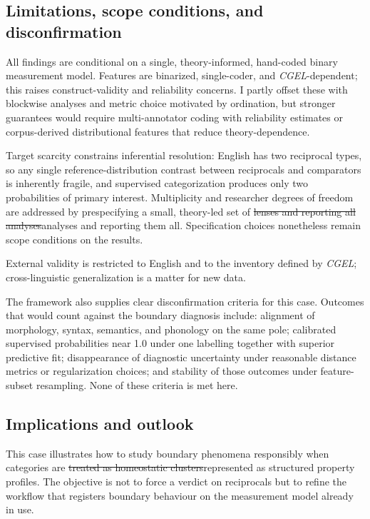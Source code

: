 \documentclass[12pt]{article}
\providecommand{\DIFaddtex}[1]{{\protect\color{DIFgreen}#1}} %
\providecommand{\DIFdeltex}[1]{{\protect\color{red}\sout{#1}}}                      %
\providecommand{\DIFaddbegin}{} %
\providecommand{\DIFaddend}{} %
\providecommand{\DIFdelbegin}{} %
\providecommand{\DIFdelend}{} %
\providecommand{\DIFadd}[1]{\texorpdfstring{\DIFaddtex{#1}}{#1}} %
\providecommand{\DIFdel}[1]{\texorpdfstring{\DIFdeltex{#1}}{}} %
\newcommand{\DIFscaledelfig}{0.5}
\newlength{\DIFdelgraphicswidth} %
\newlength{\DIFdelgraphicsheight} %
\newcommand{\DIFaddincludegraphics}[2][]{{\color{DIFgreen}\fbox{\DIFOincludegraphics[#1]{#2}}}} %
\newcommand{\DIFdelincludegraphics}[2][]{%
\sbox{\DIFdelgraphicsbox}{\DIFOincludegraphics[#1]{#2}}%
\settoboxwidth{\DIFdelgraphicswidth}{\DIFdelgraphicsbox} %
\settoboxtotalheight{\DIFdelgraphicsheight}{\DIFdelgraphicsbox} %
\scalebox{\DIFscaledelfig}{%
\parbox[b]{\DIFdelgraphicswidth}{\usebox{\DIFdelgraphicsbox}\\[-\baselineskip] \rule{\DIFdelgraphicswidth}{0em}}\llap{\resizebox{\DIFdelgraphicswidth}{\DIFdelgraphicsheight}{%
\setlength{\unitlength}{\DIFdelgraphicswidth}%
\begin{picture}(1,1)%
\thicklines\linethickness{2pt} %
{\color[rgb]{1,0,0}\put(0,0){\framebox(1,1){}}}%
{\color[rgb]{1,0,0}\put(0,0){\line( 1,1){1}}}%
{\color[rgb]{1,0,0}\put(0,1){\line(1,-1){1}}}%
\end{picture}%
}\hspace*{3pt}}} %
} %
\DeclareRobustCommand{\DIFaddbegin}{\DIFOaddbegin \let\includegraphics\DIFaddincludegraphics} %
\DeclareRobustCommand{\DIFaddend}{\DIFOaddend \let\includegraphics\DIFOincludegraphics} %
\DeclareRobustCommand{\DIFdelbegin}{\DIFOdelbegin \let\includegraphics\DIFdelincludegraphics} %
\DeclareRobustCommand{\DIFdelend}{\DIFOaddend \let\includegraphics\DIFOincludegraphics} %
\begin{document}
\subsection{Limitations, scope conditions, and disconfirmation}

All findings are conditional on a single, theory-informed, hand-coded binary measurement model. Features are binarized, single-coder, and \textit{CGEL}-dependent; this raises construct-validity and reliability concerns. I partly offset these with blockwise analyses and metric choice motivated by ordination, but stronger guarantees would require multi-annotator coding with reliability estimates or corpus-derived distributional features that reduce theory-dependence.

Target scarcity constrains inferential resolution: English has two reciprocal types, so any single reference-distribution contrast between reciprocals and comparators is inherently fragile, and supervised categorization produces only two probabilities of primary interest. Multiplicity and researcher degrees of freedom are addressed by prespecifying a small, theory-led set of \DIFdelbegin \DIFdel{lenses and reporting all analyses}\DIFdelend \DIFaddbegin \DIFadd{analyses and reporting them all}\DIFaddend . Specification choices nonetheless remain scope conditions on the results.

External validity is restricted to English and to the inventory defined by \textit{CGEL}; cross-linguistic generalization is a matter for new data.

The framework also supplies clear disconfirmation criteria for this case. Outcomes that would count against the boundary diagnosis include: alignment of morphology, syntax, semantics, and phonology on the same pole; calibrated supervised probabilities near 1.0 under one labelling together with superior predictive fit; disappearance of diagnostic uncertainty under reasonable distance metrics or regularization choices; and stability of those outcomes under feature-subset resampling. None of these criteria is met here.

\subsection{Implications and outlook}

This case illustrates how to study boundary phenomena responsibly when categories are \DIFdelbegin \DIFdel{treated as homeostatic clusters}\DIFdelend \DIFaddbegin \DIFadd{represented as structured property profiles}\DIFaddend . The objective is not to force a verdict on reciprocals but to refine the workflow that registers boundary behaviour on the measurement model already in use.
\end{document}

